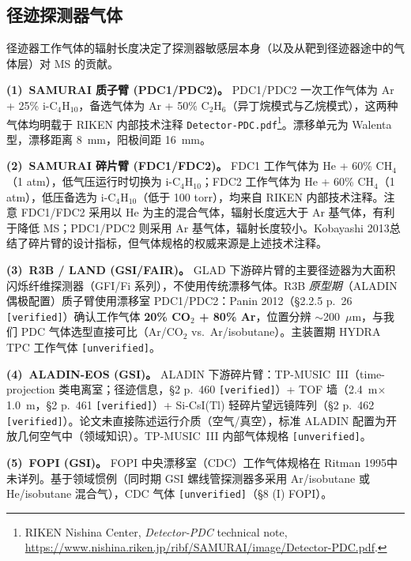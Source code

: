 \documentclass[a4paper, 11pt]{article}
\begin{document}
\subsection{径迹探测器气体}
\label{sec:trackergas}

径迹器工作气体的辐射长度决定了探测器敏感层本身（以及从靶到径迹器途中的气体层）对 MS 的贡献。

\textbf{(1)~SAMURAI 质子臂 (PDC1/PDC2)。}
PDC1/PDC2 一次工作气体为 Ar + 25\% i-C$_4$H$_{10}$，备选气体为 Ar + 50\% C$_2$H$_6$（异丁烷模式与乙烷模式），这两种气体均明载于 RIKEN 内部技术注释 \texttt{Detector-PDC.pdf}\footnote{\label{fn:detectorpdc_hw}RIKEN Nishina Center, \emph{Detector-PDC} technical note, \url{https://www.nishina.riken.jp/ribf/SAMURAI/image/Detector-PDC.pdf}.}。漂移单元为 Walenta 型，漂移距离 8~mm，阳极间距 16~mm。

\textbf{(2)~SAMURAI 碎片臂 (FDC1/FDC2)。}
FDC1 工作气体为 He + 60\% CH$_4$（1 atm），低气压运行时切换为 i-C$_4$H$_{10}$；FDC2 工作气体为 He + 60\% CH$_4$（1 atm），低压备选为 i-C$_4$H$_{10}$（低于 100 torr），均来自 RIKEN 内部技术注释。注意 FDC1/FDC2 采用以 He 为主的混合气体，辐射长度远大于 Ar 基气体，有利于降低 MS；PDC1/PDC2 则采用 Ar 基气体，辐射长度较小。Kobayashi 2013总结了碎片臂的设计指标，但气体规格的权威来源是上述技术注释。

\textbf{(3)~R3B / LAND (GSI/FAIR)。}
GLAD 下游碎片臂的主要径迹器为大面积闪烁纤维探测器（GFI/Fi 系列），不使用传统漂移气体。R3B \emph{原型期}（ALADIN 偶极配置）质子臂使用漂移室 PDC1/PDC2：Panin 2012（§2.2.5 p.~26 \texttt{[verified]}）确认工作气体 \textbf{20\% CO$_2$ + 80\% Ar}，位置分辨 $\sim$200~$\mu$m，与我们 PDC 气体选型直接可比（Ar/CO$_2$ vs.\ Ar/isobutane）。主装置期 HYDRA TPC 工作气体 \texttt{[unverified]}。

\textbf{(4)~ALADIN-EOS (GSI)。}
ALADIN 下游碎片臂：TP-MUSIC~III（time-projection 类电离室；径迹信息，§2 p.~460 \texttt{[verified]}）+ TOF 墙（2.4~m$\times$1.0~m，§2 p.~461 \texttt{[verified]}）+ Si-CsI(Tl) 轻碎片望远镜阵列（§2 p.~462 \texttt{[verified]}）。论文未直接陈述运行介质（空气/真空），标准 ALADIN 配置为开放几何空气中（领域知识）。TP-MUSIC~III 内部气体规格 \texttt{[unverified]}。

\textbf{(5)~FOPI (GSI)。}
FOPI 中央漂移室（CDC）工作气体规格在 Ritman 1995中未详列。基于领域惯例（同时期 GSI 螺线管探测器多采用 Ar/isobutane 或 He/isobutane 混合气），CDC 气体 \texttt{[unverified]}（§8 (I) FOPI）。
\end{document}
